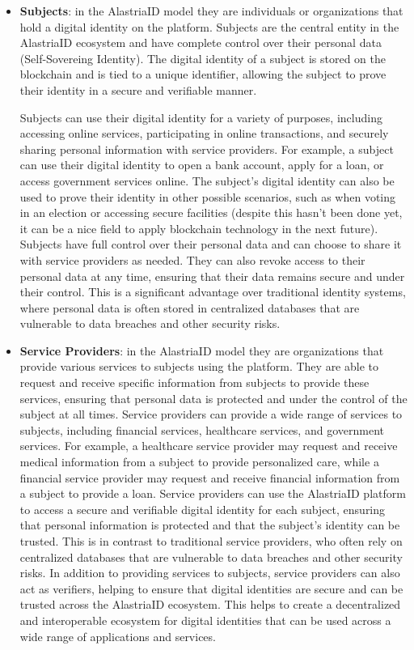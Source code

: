 \documentclass[target=mst,aauheader=]{thud}
\begin{document}
\begin{itemize}

    \item \textbf{Subjects}: in the AlastriaID model they are individuals or organizations that hold a digital identity on the platform. Subjects are the central entity in the AlastriaID ecosystem and have complete control over their personal data (Self-Sovereing Identity). The digital identity of a subject is stored on the blockchain and is tied to a unique identifier, allowing the subject to prove their identity in a secure and verifiable manner.\par
        Subjects can use their digital identity for a variety of purposes, including accessing online services, participating in online transactions, and securely sharing personal information with service providers. For example, a subject can use their digital identity to open a bank account, apply for a loan, or access government services online. The subject's digital identity can also be used to prove their identity in other possible scenarios, such as when voting in an election or accessing secure facilities (despite this hasn't been done yet, it can be a nice field to apply blockchain technology in the next future).
        Subjects have full control over their personal data and can choose to share it with service providers as needed. They can also revoke access to their personal data at any time, ensuring that their data remains secure and under their control. This is a significant advantage over traditional identity systems, where personal data is often stored in centralized databases that are vulnerable to data breaches and other security risks.

    \item \textbf{Service Providers}: in the AlastriaID model they are organizations that provide various services to subjects using the platform. They are able to request and receive specific information from subjects to provide these services, ensuring that personal data is protected and under the control of the subject at all times. Service providers can provide a wide range of services to subjects, including financial services, healthcare services, and government services. For example, a healthcare service provider may request and receive medical information from a subject to provide personalized care, while a financial service provider may request and receive financial information from a subject to provide a loan.
        Service providers can use the AlastriaID platform to access a secure and verifiable digital identity for each subject, ensuring that personal information is protected and that the subject's identity can be trusted. This is in contrast to traditional service providers, who often rely on centralized databases that are vulnerable to data breaches and other security risks.
        In addition to providing services to subjects, service providers can also act as verifiers, helping to ensure that digital identities are secure and can be trusted across the AlastriaID ecosystem. This helps to create a decentralized and interoperable ecosystem for digital identities that can be used across a wide range of applications and services.


\end{itemize}
\end{document}
